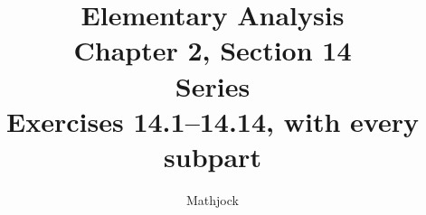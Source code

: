 
\title{\textbf{Elementary Analysis}\\[0.3em]
Chapter 2, Section 14\\[0.3em]
\large Series\\
Exercises 14.1--14.14, with every subpart}
\author{Mathjock}
\date{}

\maketitle
\bookinfo
\tableofcontents
\clearpage
\setcounter{section}{13}



